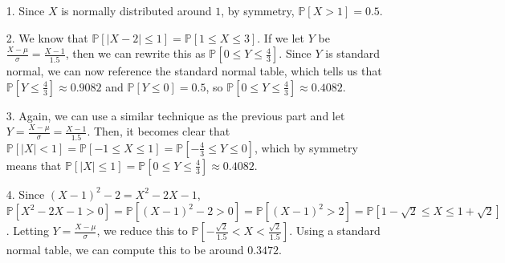 \documentclass[a4paper]{article}
\begin{document}
\begin{Solution}
	\begin{itemize}
		\item[1.] Since $X$ is normally distributed around $1$, by symmetry, $\mathbb{P}[X > 1] = 0.5.$ 
		\item[2.] We know that $\mathbb{P}[|X - 2| \le 1] = \mathbb{P}[1 \le X \le 3]$. If we let $Y$ be $\frac{X - \mu}{\sigma} = \frac{X - 1}{1.5}$, then we can rewrite this as $\mathbb{P}\left[0 \le Y \le \frac{4}{3}\right]$. Since $Y$ is standard normal, we can now reference the standard normal table, which tells us that $\mathbb{P}\left[Y \le \frac{4}{3}\right] \approx 0.9082$ and $\mathbb{P}\left[Y \le 0\right] = 0.5$, so $\mathbb{P}\left[0 \le Y \le \frac{4}{3}\right] \approx 0.4082.$
		\item[3.] Again, we can use a similar technique as the previous part and let $Y= \frac{X - \mu}{\sigma} = \frac{X - 1}{1.5}$. Then, it becomes clear that $\mathbb{P}[|X| < 1] =\mathbb{P}[-1 \le X \le 1] =\mathbb{P}\left[ -\frac{4}{3} \le Y \le 0 \right]$, which by symmetry means that $\mathbb{P}[|X| \le 1] = \mathbb{P}\left[0 \le Y \le \frac{4}{3}\right] \approx 0.4082.$
		\item[4.] Since $(X - 1)^2 - 2 = X^2 - 2X - 1$, $\mathbb{P}[X^2 - 2X - 1 > 0] = \mathbb{P}[(X - 1)^2 - 2 > 0] = \mathbb{P}[(X - 1)^2 > 2] = \mathbb{P}[1 - \sqrt{2} \le X \le 1 + \sqrt{2}]$. Letting $Y = \frac{X - \mu}{\sigma}$, we reduce this to $\mathbb{P}\left[-\frac{\sqrt{2}}{1.5} < X < \frac{\sqrt{2}}{1.5}\right]$. Using a standard normal table, we can compute this to be around $0.3472$.
	\end{itemize}
\end{Solution}
\end{document}
